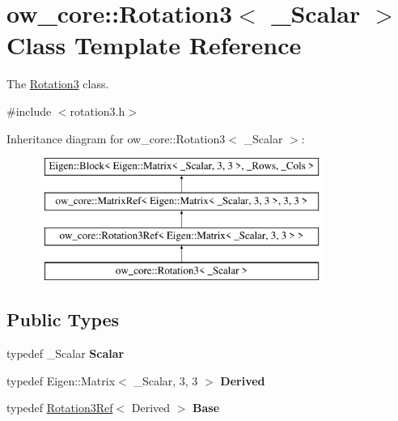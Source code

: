 \hypertarget{classow__core_1_1Rotation3}{}\section{ow\+\_\+core\+:\+:Rotation3$<$ \+\_\+\+Scalar $>$ Class Template Reference}
\label{classow__core_1_1Rotation3}


The \hyperlink{classow__core_1_1Rotation3}{Rotation3} class.  




{\ttfamily \#include $<$rotation3.\+h$>$}

Inheritance diagram for ow\+\_\+core\+:\+:Rotation3$<$ \+\_\+\+Scalar $>$\+:\begin{figure}[H]
\begin{center}
\leavevmode
\includegraphics[height=4.000000cm]{db/dd7/classow__core_1_1Rotation3}
\end{center}
\end{figure}
\subsection*{Public Types}
\begin{DoxyCompactItemize}
\item 
typedef \+\_\+\+Scalar {\bfseries Scalar}\hypertarget{classow__core_1_1Rotation3_a470ab3889d669c7c775de59719a05cd5}{}\label{classow__core_1_1Rotation3_a470ab3889d669c7c775de59719a05cd5}

\item 
typedef Eigen\+::\+Matrix$<$ \+\_\+\+Scalar, 3, 3 $>$ {\bfseries Derived}\hypertarget{classow__core_1_1Rotation3_aaa3e83f38709cf7ea047d0a21423b3ef}{}\label{classow__core_1_1Rotation3_aaa3e83f38709cf7ea047d0a21423b3ef}

\item 
typedef \hyperlink{classow__core_1_1Rotation3Ref}{Rotation3\+Ref}$<$ Derived $>$ {\bfseries Base}\hypertarget{classow__core_1_1Rotation3_ae25fa89b75676d23b296fcae485f7b71}{}\label{classow__core_1_1Rotation3_ae25fa89b75676d23b296fcae485f7b71}

\end{DoxyCompactItemize}
